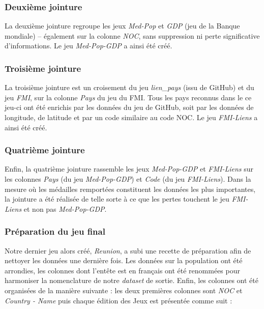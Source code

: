 \documentclass[hidelinks, 12pt]{article}
\begin{document}
\subsubsection{Deuxième jointure}

La deuxième jointure regroupe les jeux \emph{Med-Pop} et \emph{GDP} (jeu de la Banque mondiale) -- également sur la colonne \emph{NOC}, sans suppression ni perte significative d'informations. Le jeu \emph{Med-Pop-GDP} a ainsi été créé.

\subsubsection{Troisième jointure}

La troisième jointure est un croisement du jeu \emph{lien\_pays} (issu de GitHub) et du jeu \emph{FMI}, sur la colonne \emph{Pays} du jeu du FMI. Tous les pays reconnus dans le ce jeu-ci ont été enrichis par les données du jeu de GitHub, soit par les données de longitude, de latitude et par un code similaire au code NOC. Le jeu \emph{FMI-Liens} a ainsi été créé.

\subsubsection{Quatrième jointure}

Enfin, la quatrième jointure rassemble les jeux \emph{Med-Pop-GDP} et \emph{FMI-Liens} sur les colonnes \emph{Pays} (du jeu \emph{Med-Pop-GDP}) et \emph{Code} (du jeu \emph{FMI-Liens}). Dans la mesure où les médailles remportées constituent les données les plus importantes, la jointure a été réalisée de telle sorte à ce que les pertes touchent le jeu \emph{FMI-Liens} et non pas \emph{Med-Pop-GDP}.

\subsubsection{Préparation du jeu final}

Notre dernier jeu alors créé, \emph{Reunion}, a subi une recette de préparation afin de nettoyer les données une dernière fois. Les données sur la population ont été arrondies, les colonnes dont l'entête est en français ont été renommées pour harmoniser la nomenclature de notre \emph{dataset} de sortie. Enfin, les colonnes ont été organisées de la manière suivante : les deux premières colonnes sont \emph{NOC} et \emph{Country - Name} puis chaque édition des Jeux est présentée comme suit :
\end{document}
